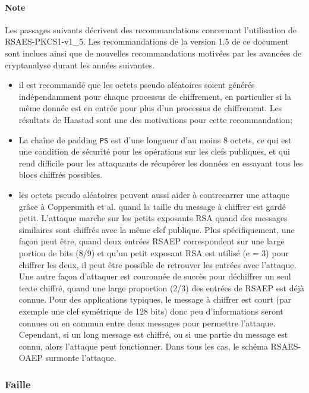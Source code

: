 \paragraph{Note} Les passages suivants décrivent des recommandations concernant l'utilisation de RSAES-PKCS1-v1\_5. Les recommandations de la version 1.5 de ce document sont inclues ainsi que de nouvelles recommandations motivées par les avancées de cryptanalyse durant les années suivantes.
\begin{itemize}
\item il est recommandé que les octets pseudo aléatoires soient générés indépendamment pour chaque processus de chiffrement, en particulier si la même donnée est en entrée pour plus d'un processus de chiffrement. Les résultats de Haastad sont une des motivations pour cette recommandation;
\item La chaîne de padding \texttt{PS} est d'une longueur d'au moins 8 octets, ce qui est une condition de sécurité pour les opérations sur les clefs publiques, et qui rend difficile pour les attaquants de récupérer les données en essayant tous les blocs chiffrés possibles.
\item les octets pseudo aléatoires peuvent aussi aider à contrecarrer une attaque grâce à Coppersmith et al. quand la taille du message à chiffrer est gardé petit. L'attaque marche sur les petits exposants RSA quand des messages similaires sont chiffrés avec la même clef publique. Plus spécifiquement, une façon peut être, quand deux entrées RSAEP correspondent sur une large portion de bits (8/9) et qu'un petit exposant RSA est utilisé (e = 3) pour chiffrer les deux, il peut être possible de retrouver les entrées avec l'attaque. Une autre façon d'attaquer est couronnée de succès pour déchiffrer un seul texte chiffré, quand une large proportion (2/3) des entrées de RSAEP est déjà connue. Pour des applications typiques, le message à chiffrer est court (par exemple une clef symétrique de 128 bits) donc peu d'informations seront connues ou en commun entre deux messages pour permettre l'attaque. Cependant, si un long message est chiffré, ou si une partie du message est connu, alors l'attaque peut fonctionner. Dans tous les cas, le schéma RSAES-OAEP surmonte l'attaque.\\
\end{itemize}

\subsubsection{Faille}


